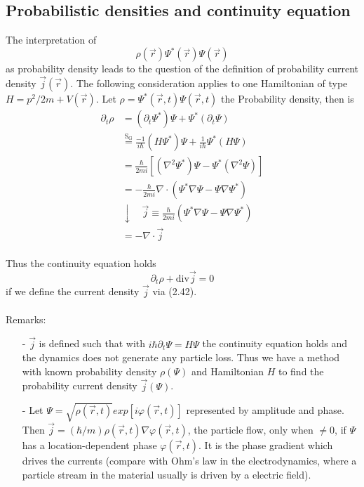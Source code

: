 \subsection{Probabilistic densities and continuity equation}
The interpretation of
\begin{equation}
    \rho(\vec{r})\Psi^*(\vec{r})\Psi(\vec{r})
\end{equation}
as probability density leads to the question of the definition of probability current density $\vec{j}(\vec{r})$. The following consideration applies to one Hamiltonian of type $H=p^2/2m+V(\vec{r})$. Let $\rho=\Psi^*(\vec{r},t)\Psi(\vec{r},t)$ the
Probability density, then is
\begin{equation}
\begin{aligned} \partial_{t} \rho &=\left(\partial_{t} \Psi^{*}\right) \Psi+\Psi^{*}\left(\partial_{t} \Psi\right) \\ & \stackrel{\mathrm{S}_{\mathrm{G}}}{=} \frac{-1}{i \hbar}\left(H \Psi^{*}\right) \Psi+\frac{1}{i \hbar} \Psi^{*}(H \Psi) \\ &=\frac{\hbar}{2 m i}\left[\left(\nabla^{2} \Psi^{*}\right) \Psi-\Psi^{*}\left(\nabla^{2} \Psi\right)\right] \\
&=-\frac{\hbar}{2 m i} \nabla \cdot\left(\Psi^{*} \nabla \Psi-\Psi \nabla \Psi^{*}\right) \\ &\downarrow \quad \vec{j} \equiv \frac{\hbar}{2 m i}\left(\Psi^{*} \nabla \Psi-\Psi \nabla \Psi^{*}\right) \\ &=-\nabla \cdot \vec{j}\end{aligned}
\end{equation}
\\
Thus the continuity equation holds
\begin{equation}
    \partial_t\rho+\text{div}\vec{j}=0
\end{equation}
if we define the current density $\vec{j}$ via (2.42).\\\\
Remarks: 
\begin{enumerate}
    \item[-] $\vec{j}$ is defined such that with $i\hbar\partial_t\Psi=H\Psi$ the continuity equation holds and the dynamics does not generate any particle loss. Thus we have a method with known probability density $\rho(\Psi)$ and Hamiltonian $H$ to find the probability current density $\vec{j}(\Psi)$.
    \item[-] Let $\Psi=\sqrt{\rho(\vec{r},t)}exp[i\varphi(\vec{r},t)]$ represented by amplitude and phase. Then $\vec{j}=(\hbar/m)\rho(\vec{r},t)\nabla\varphi(\vec{r},t)$, the particle flow, only when $\neq 0$, if $\Psi$ has a location-dependent phase $\varphi(\vec{r},t)$. It is the phase gradient which drives the currents (compare with Ohm's law in the electrodynamics, where a particle stream in the material usually is driven by a electric field).
\end{enumerate}
